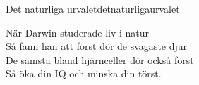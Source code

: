 \begin{song}{Det naturliga urvalet}{detnaturligaurvalet}
    \av{}
    \begin{vers}
        När Darwin studerade liv i natur\\
        Så fann han att först dör de svagaste djur\\
        De sämsta bland hjärnceller dör också först\\
        Så öka din IQ och minska din törst.\\
    \end{vers}
    \end{song}